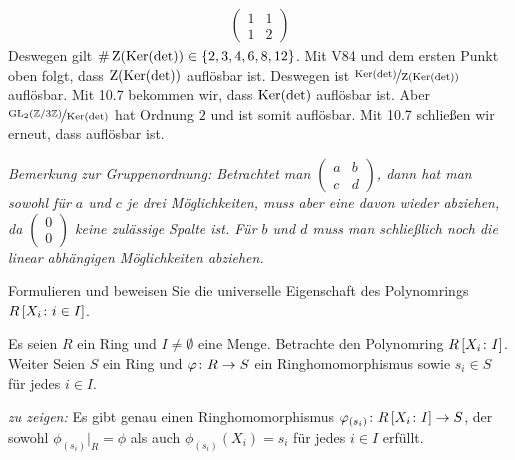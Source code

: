 \begin{exercisePage}
\begin{solution}
\begin{itemize}[leftmargin=*]
\begin{align*}
                \begin{pmatrix} 1 & 1 \\ 1 & 2 \end{pmatrix}
            \end{align*}
            Deswegen gilt $\# \operatorname{Z}(\operatorname{Ker}(\det)) \in \left\{ 2,3,4,6,8,12 \right\}$. Mit V84 und dem ersten Punkt oben folgt, dass $\operatorname{Z}(\operatorname{Ker}(\det))$ auflösbar ist. Deswegen ist $\lfrac{\Ker(\det)}{\zentrum(\Ker(\det))}$ auflösbar. Mit 10.7 bekommen wir, dass $\operatorname{Ker}(\det)$ auflösbar ist. Aber $\lfrac{\gruppegl}{\Ker(\det)}$ hat Ordnung $2$ und ist somit auflösbar. Mit 10.7 schließen wir erneut, dass \gruppegl auflösbar ist. 
        \end{itemize}
        {\itshape Bemerkung zur Gruppenordnung: Betrachtet man $\left( \begin{smallmatrix} a & b \\ c & d \end{smallmatrix} \right)$, dann hat man sowohl für $a$ und $c$ je drei Möglichkeiten, muss aber eine davon wieder abziehen, da $\left( \begin{smallmatrix}  0 \\ 0 \end{smallmatrix} \right)$ keine zulässige Spalte ist. Für $b$ und $d$ muss man schließlich noch die linear abhängigen Möglichkeiten abziehen.}
    \end{solution}
    \undef\gruppegl

    
    \newcommand{\RXi}{\polynomring{R}{X_i \colon i \in I}}
    \begin{exercise}
        Formulieren und beweisen Sie die universelle Eigenschaft des Polynomrings $R \left[ X_i \colon i \in I \right]$.
    \end{exercise}
    \begin{solution}
        Es seien $R$ ein Ring und $I \neq \emptyset$ eine Menge. Betrachte den Polynomring $R \left[ X_i \colon I \right]$. Weiter Seien $S$ ein Ring und $\varphi \colon R \to S$ ein Ringhomomorphismus sowie $s_i \in S$ für jedes $i \in I$.
        
        \textit{zu zeigen:}
        Es gibt genau einen Ringhomomorphismus $\varphi_{(s_i)} \colon R \left[ X_i \colon I \right] \to S$, der sowohl $\phi_{(s_i)} |_R = \phi$ als auch $\phi_{(s_i)}(X_i)=s_i$ für jedes $i \in I$ erfüllt.
        

\end{solution}
\end{exercisePage}
